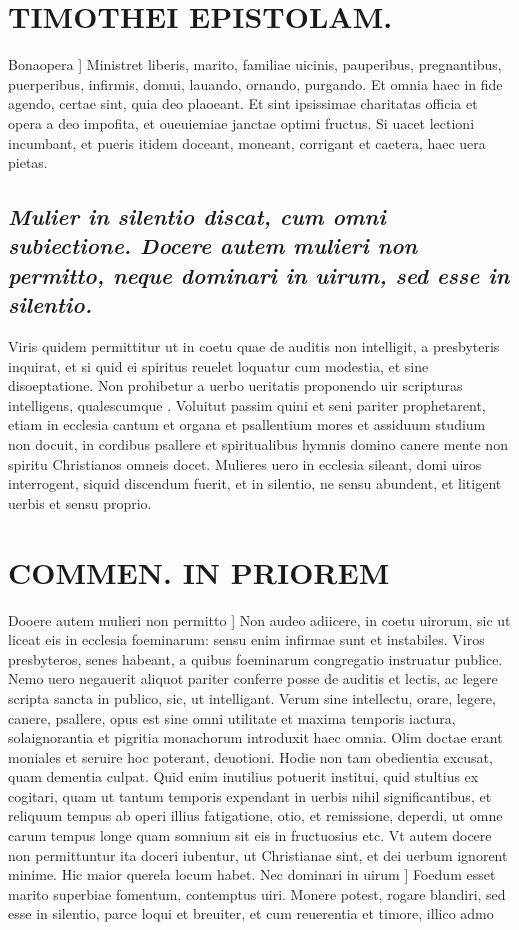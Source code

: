 \documentclass{article}
\begin{document}
\begin{pages}
\section*{TIMOTHEI EPISTOLAM. }
\marginpar{[ p.49 ]}\pstart Bonaopera ] Ministret liberis, marito, familiae uicinis, pauperibus, pregnantibus, puerperibus, infirmis, domui, lauando, ornando, purgando. Et omnia haec in fide agendo, certae sint, quia deo plaoeant. Et sint ipsissimae charitatas officia et opera a deo impofita, et oueuiemiae janctae optimi fructus. Si uacet lectioni incumbant, et pueris itidem doceant, moneant, corrigant et caetera, haec uera pietas.  \pend
{}
{}
\subsection*{\textit{Mulier in silentio discat, cum omni subiectione. Docere autem mulieri non permitto, neque  dominari in uirum, sed esse in silentio. }}\pstart Viris quidem permittitur ut in coetu quae de auditis non intelligit, a presbyteris inquirat, et si quid ei spiritus reuelet loquatur cum modestia, et sine disoeptatione. Non prohibetur a uerbo ueritatis proponendo uir scripturas intelligens, qualescumque . Voluitut passim quini et seni pariter prophetarent, etiam in ecclesia cantum et organa et psallentium mores et assiduum studium non docuit, in cordibus psallere et spiritualibus hymnis domino canere mente non spiritu Christianos omneis docet. Mulieres uero in ecclesia sileant, domi uiros interrogent, siquid discendum fuerit, et in silentio, ne sensu abundent, et litigent uerbis et sensu proprio.  \pend
\section*{COMMEN. IN PRIOREM }
\marginpar{[ p.60 ]}\pstart Dooere autem mulieri non permitto ] Non audeo adiicere, in coetu uirorum, sic ut liceat eis in ecclesia foeminarum: sensu enim infirmae sunt et instabiles. Viros presbyteros, senes habeant, a quibus foeminarum congregatio instruatur publice. Nemo uero negauerit aliquot pariter conferre posse de auditis et lectis, ac legere scripta sancta in publico, sic, ut intelligant. Verum sine intellectu, orare, legere, canere, psallere, opus est sine omni utilitate et maxima temporis iactura, solaignorantia et pigritia monachorum introduxit haec omnia. Olim doctae erant moniales et seruire hoc poterant, deuotioni. Hodie non tam obedientia excusat, quam dementia culpat. Quid enim inutilius potuerit institui, quid stultius ex cogitari, quam ut tantum temporis expendant in uerbis nihil significantibus, et reliquum tempus ab operi illius fatigatione, otio, et remissione, deperdi, ut omne carum tempus longe quam somnium sit eis in fructuosius etc. Vt autem docere non permittuntur ita doceri iubentur, ut Christianae sint, et dei uerbum ignorent minime. Hic maior querela locum habet.  \pend\pstart Nec dominari in uirum ] Foedum esset marito superbiae fomentum, contemptus uiri. Monere potest, rogare blandiri, sed esse in silentio, parce loqui et breuiter, et cum reuerentia et timore, illico admo\pend

\end{pages}
\end{document}
